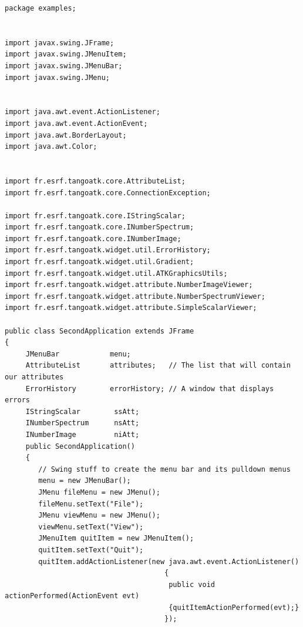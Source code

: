 \begin{verbatim}
package examples;
 

import javax.swing.JFrame;
import javax.swing.JMenuItem;
import javax.swing.JMenuBar;
import javax.swing.JMenu;
 

import java.awt.event.ActionListener;
import java.awt.event.ActionEvent;
import java.awt.BorderLayout;
import java.awt.Color;
 

import fr.esrf.tangoatk.core.AttributeList;
import fr.esrf.tangoatk.core.ConnectionException;
 
import fr.esrf.tangoatk.core.IStringScalar;
import fr.esrf.tangoatk.core.INumberSpectrum;
import fr.esrf.tangoatk.core.INumberImage;
import fr.esrf.tangoatk.widget.util.ErrorHistory;
import fr.esrf.tangoatk.widget.util.Gradient;
import fr.esrf.tangoatk.widget.util.ATKGraphicsUtils;
import fr.esrf.tangoatk.widget.attribute.NumberImageViewer;
import fr.esrf.tangoatk.widget.attribute.NumberSpectrumViewer;
import fr.esrf.tangoatk.widget.attribute.SimpleScalarViewer;

public class SecondApplication extends JFrame
{
     JMenuBar            menu;
     AttributeList       attributes;   // The list that will contain our attributes
     ErrorHistory        errorHistory; // A window that displays errors
     IStringScalar        ssAtt;
     INumberSpectrum      nsAtt;
     INumberImage         niAtt;
     public SecondApplication()
     {
        // Swing stuff to create the menu bar and its pulldown menus
        menu = new JMenuBar();
        JMenu fileMenu = new JMenu();
        fileMenu.setText("File");   
        JMenu viewMenu = new JMenu();
        viewMenu.setText("View");
        JMenuItem quitItem = new JMenuItem();
        quitItem.setText("Quit");
        quitItem.addActionListener(new java.awt.event.ActionListener()
                                      {                 
                                       public void actionPerformed(ActionEvent evt)
                                       {quitItemActionPerformed(evt);}
                                      });


\end{verbatim}
